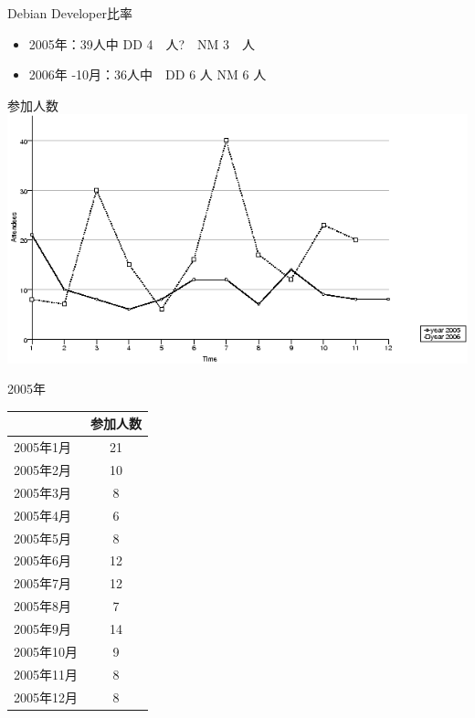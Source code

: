 \documentclass[cjk,dvipdfmx]{beamer}
\begin{document}
\begin{frame}{Debian Developer比率}

 \begin{itemize}
 \item 2005年：39人中 DD 4　人?　NM 3　人
 \item 2006年 -10月：36人中　DD 6 人 NM 6 人
 \end{itemize}
\end{frame}

\begin{frame}{参加人数}
 \includegraphics[width=1\hsize]{image200612/people-chart.png}
\end{frame}

\begin{frame}{2005年}
  \begin{tabular}{|l|c|}
 \hline
   & 参加人数 \\
 \hline
   2005年1月 & 21 \\
   2005年2月 & 10 \\
   2005年3月 & 8\\
   2005年4月 & 6\\
   2005年5月 & 8\\
   2005年6月 & 12\\
   2005年7月 & 12\\
   2005年8月 & 7\\
   2005年9月 & 14\\
   2005年10月 & 9\\
   2005年11月 & 8\\
   2005年12月 & 8 \\
 \hline
  \end{tabular}
\end{frame}
\end{document}
